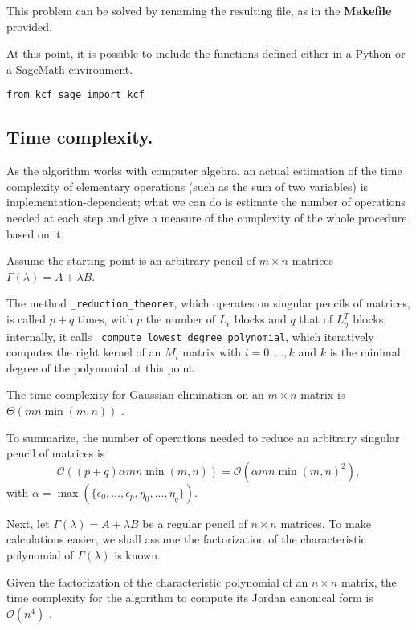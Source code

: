 This problem can be solved by renaming the resulting file, as in the \textbf{Makefile} provided.

At this point, it is possible to include the functions defined either in a Python or a SageMath environment.
\begin{verbatim}
from kcf_sage import kcf
\end{verbatim}

\subsection*{Time complexity.}
As the algorithm works with computer algebra, an actual estimation of the time complexity of elementary operations
(such as the sum of two variables) is implementation-dependent; what we can do is estimate the number of operations
needed at each step and give a measure of the complexity of the whole procedure based on it.

Assume the starting point is an arbitrary pencil of \(m \times n\) matrices \(\Gamma(\lambda) = A+\lambda B\).

The method \texttt{_reduction_theorem}, which operates on singular pencils of matrices,
is called \(p + q\) times, with \(p\) the number of \(L_\epsilon\) blocks and \(q\)
that of \(L^T_\eta\) blocks; internally, it calls \texttt{_compute_lowest_degree_polynomial}, which
iteratively computes the right kernel of an \(M_i\) matrix with \(i = 0, ..., k\) and \(k\) is the minimal degree
of the polynomial at this point.

\begin{remark}
    The time complexity for Gaussian elimination on an \(m \times n\) matrix is
    \(\Theta(mn \min(m, n))\) \cite{boyd_vandenberghe_2018}.
\end{remark}

To summarize, the number of operations needed to reduce an arbitrary singular pencil of matrices is
\[
    \mathcal{O}((p + q)\alpha mn \min(m, n)) = \mathcal{O}(\alpha mn \min(m, n)^2),
\]
with \(\alpha = \max(\{\epsilon_0, ..., \epsilon_p, \eta_0, ..., \eta_q\})\).

Next, let \(\Gamma(\lambda) = A + \lambda B\) be a regular pencil of \(n \times n\) matrices. To make calculations
easier, we shall assume the factorization of the characteristic polynomial of \(\Gamma(\lambda)\) is known.

\begin{remark}
    Given the factorization of the characteristic polynomial of an \(n \times n\) matrix, the time complexity
    for the algorithm to compute its Jordan canonical form is \(\mathcal{O}(n^4)\)
    \cite{DBLP:journals/corr/abs-cs-0412005}.
\end{remark}

